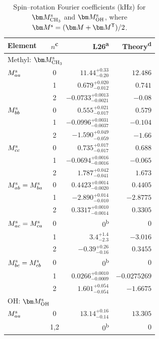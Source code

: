 \begin{table}
\begingroup
\caption{Spin--rotation Fourier coefficients (kHz) for $\bm M^{\rm s}_{\rm CH_3}$ and $\bm M^{\rm s}_{\rm OH}$, where $\bm M^{\rm s}=(\bm M+\bm M^{\mathsf T})/2$.}
\label{tab:fit-sr}
\centering
\begingroup
\small
\setlength{\tabcolsep}{3.5pt}
\renewcommand{\arraystretch}{1.0}
\begin{tabular}{@{}lcrr@{}}
\toprule
Element & $n$\textsuperscript{c} & L26\textsuperscript{a} & Theory\textsuperscript{d}\\
\midrule
\multicolumn{4}{l}{Methyl: $\bm M^{\rm s}_{\rm CH_3}$}\\
$M^{\rm s}_{aa}$ & 0 & ${11.44}_{-0.20}^{+0.33}$ & $12.486$\\
 & 1 & ${0.679}_{-0.012}^{+0.020}$ & $0.741$\\
 & 2 & ${-0.0733}_{-0.0021}^{+0.0013}$ & $-0.08$\\
$M^{\rm s}_{bb}$ & 0 & ${0.555}_{-0.017}^{+0.021}$ & $0.579$\\
 & 1 & ${-0.0996}_{-0.0037}^{+0.0031}$ & $-0.104$\\
 & 2 & ${-1.590}_{-0.059}^{+0.049}$ & $-1.66$\\
$M^{\rm s}_{cc}$ & 0 & ${0.735}_{-0.017}^{+0.017}$ & $0.688$\\
 & 1 & ${-0.0694}_{-0.0016}^{+0.0016}$ & $-0.065$\\
 & 2 & ${1.787}_{-0.041}^{+0.042}$ & $1.673$\\
$M^{\rm s}_{ab}=M^{\rm s}_{ba}$ & 0 & ${0.4423}_{-0.0020}^{+0.0014}$ & $0.4405$\\
 & 1 & ${-2.890}_{-0.010}^{+0.014}$ & $-2.8775$\\
 & 2 & ${0.3317}_{-0.0014}^{+0.0010}$ & $0.3305$\\
$M^{\rm s}_{ac}=M^{\rm s}_{ca}$ & 0 & $0$\textsuperscript{b} & $0$\\
 & 1 & ${3.4}_{-2.3}^{+1.4}$ & $-3.016$\\
 & 2 & ${-0.39}_{-0.16}^{+0.26}$ & $0.3455$\\
$M^{\rm s}_{bc}=M^{\rm s}_{cb}$ & 0 & $0$\textsuperscript{b} & $0$\\
 & 1 & ${0.0266}_{-0.0009}^{+0.0010}$ & $-0.0275269$\\
 & 2 & ${1.601}_{-0.054}^{+0.054}$ & $-1.6675$\\
\midrule
\multicolumn{4}{l}{OH: $\bm M^{\rm s}_{\rm OH}$}\\
$M^{\rm s}_{aa}$ & 0 & ${13.14}_{-0.14}^{+0.16}$ & $13.305$\\
 & 1,2 & $0$\textsuperscript{b} & $0$\\

\end{tabular}
\end{table}
